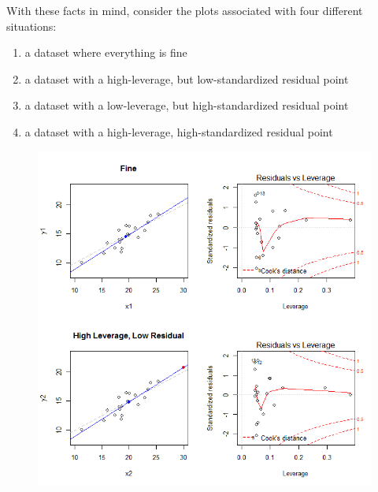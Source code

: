 \documentclass[residuals.tex]{subfiles}
\begin{document}
With these facts in mind, consider the plots associated with four different situations:
\begin{enumerate}
	\item a dataset where everything is fine
	\item a dataset with a high-leverage, but low-standardized residual point
	\item a dataset with a low-leverage, but high-standardized residual point
	\item a dataset with a high-leverage, high-standardized residual point
\end{enumerate}
\newpage
\begin{figure}[h!]
	\centering
	\includegraphics[width=1.0\linewidth]{plots2}
	\caption{}
	\label{fig:plots2}
\end{figure}
\newpage
\end{document}
